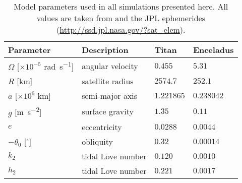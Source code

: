 \begin{table}[!t]
\scriptsize
\centering
\begin{tabularx}{\linewidth}{p{1.8cm} p{2cm} p{1cm} p{1.2cm}}
 \toprule
Parameter & Description & Titan & Enceladus\\
 \midrule \midrule
$\Omega$ [$\times 10^{-5}$ \si{\radian\per\second}]	& angular velocity 		& $0.455$ & $5.31 $ \\
$R$ [\si{\kilo\metre}]				& satellite radius 		& $2574.7$ & $252.1$\\
$a$ [$\times 10^6$ \si{\kilo\metre}]				& semi-major axis 		& $1.221865$ & $0.238042$\\
$g$ [\si{\metre\per\second\squared}]		& surface gravity 		& $1.35$ & $0.11$\\
$e$ 								& eccentricity 			& $0.0288$ & $0.0044$\\
$-\theta_0$ [$^{\circ}$] 			& obliquity 			& $0.32$ & $0.00014$\\
$k_2$ 								& tidal Love number 	& $0.120$ & $0.0010$\\
$h_2$ 								& tidal Love number 	& $0.221$ & $0.0017$\\
 \bottomrule
\end{tabularx}
\caption{Model parameters used in all simulations presented here. All values are taken from \citet{zebker2009size,chen2013tidal,matsuyama2014tidal} and the JPL ephemerides (\url{http://ssd.jpl.nasa.gov/?sat_elem}).  \label{tb:param}}
\end{table}